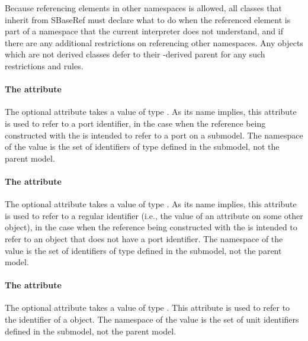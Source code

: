 Because referencing elements in other namespaces is allowed, all classes that
inherit from SBaseRef must declare what to do when the referenced element
is part of a namespace that the current interpreter does not understand, and
if there are any additional restrictions on referencing other namespaces.  Any
\SBaseRef objects which are not derived classes defer to their \SBaseRef-derived
parent for any such restrictions and rules.


\paragraph{The \fixttspace{} attribute}
\label{sbaseref-portref}

The optional attribute  takes a value of type
.  As its name implies, this attribute is used to
refer to a port identifier, in the case when the reference being
constructed with the \SBaseRef is intended to refer to a port on a
submodel.  The namespace of the  value is the set
of identifiers of type  defined in the submodel, not
the parent model.


\paragraph{The \fixttspace{} attribute}
\label{sbaseref-idref}

The optional attribute  takes a value of type
.  As its name implies, this attribute is used to
refer to a regular identifier (i.e., the value of an 
attribute on some other object), in the case when the reference being
constructed with the \SBaseRef is intended to refer to an object that
does not have a port identifier.  The namespace of the 
value is the set of identifiers of type  defined in the
submodel, not the parent model.


\paragraph{The \fixttspace{} attribute}
\label{sbaseref-unitref}

The optional attribute  takes a value of type
.  This attribute is used to refer to the identifier
of a \UnitDefinition object.  The namespace of the 
value is the set of unit identifiers defined in the submodel, not the
parent model.

